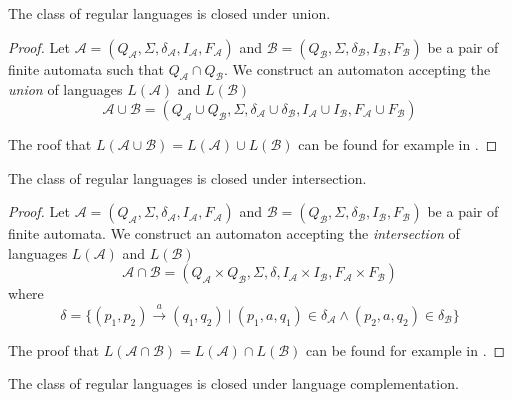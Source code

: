 \begin{theorem}
 The class of regular languages is closed under union.
\end{theorem}

\begin{proof}
Let $\mathcal{A} = (Q_\mathcal{A}, \Sigma, \delta_\mathcal{A}, I_\mathcal{A},
F_\mathcal{A})$ and $\mathcal{B} = (Q_\mathcal{B}, \Sigma, \delta_\mathcal{B},
I_\mathcal{B}, F_\mathcal{B})$ be a pair of finite automata such that
$Q_\mathcal{A} \cap Q_\mathcal{B}$. We construct an automaton accepting the
\emph{union} of languages $L(\mathcal{A})$ and $L(\mathcal{B})$  
 \begin{equation} \mathcal{A} \cup \mathcal{B} = (Q_\mathcal{A} \cup
 Q_\mathcal{B}, \Sigma, \delta_\mathcal{A} \cup \delta_\mathcal{B},
 I_\mathcal{A} \cup I_\mathcal{B}, F_\mathcal{A} \cup
F_\mathcal{B})
\end{equation}
	
The roof that $L(\mathcal{A} \cup \mathcal{B}) = L(\mathcal{A}) \cup
L(\mathcal{B})$ can be found for example in \cite{tin}.
\end{proof}

  \begin{theorem}
	 The class of regular languages is closed under intersection.
	\end{theorem}
	
	\begin{proof}
Let $\mathcal{A} = (Q_\mathcal{A}, \Sigma, \delta_\mathcal{A}, I_\mathcal{A},
F_\mathcal{A})$ and $\mathcal{B} = (Q_\mathcal{B}, \Sigma, \delta_\mathcal{B},
I_\mathcal{B}, F_\mathcal{B})$ be a pair of finite automata. We construct an
automaton accepting the \emph{intersection} of languages $L(\mathcal{A})$ and
$L(\mathcal{B})$ 
\begin{equation}
\mathcal{A} \cap \mathcal{B} = (Q_\mathcal{A} \times
Q_\mathcal{B}, \Sigma, \delta, I_\mathcal{A} \times I_\mathcal{B}, F_\mathcal{A}
\times F_\mathcal{B})
\end{equation} where 
\begin{equation}
\delta = \{(p_1, p_2)
\overset{a}{\longrightarrow} (q_1, q_2)\ |\ (p_1, a, q_1) \in \delta_\mathcal{A}
\wedge (p_2, a, q_2) \in \delta_\mathcal{B}\}
\end{equation}
	
The proof that $L(\mathcal{A} \cap \mathcal{B}) = L(\mathcal{A}) \cap
L(\mathcal{B})$ can be found for example in \cite{tin}.
\end{proof}
	
 \begin{theorem}
  The class of regular languages is closed under language complementation.
\end{theorem}
	
